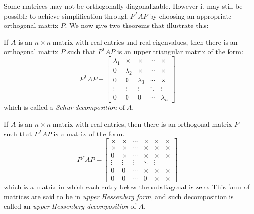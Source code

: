 \documentclass{report}
\begin{document}
			Some matrices may not be orthogonally diagonalizable. However it may still be possible to achieve simplification through $P^TAP$ by choosing an appropriate orthogonal matrix $P$. We now give two theorems that illustrate this:
			
			\begin{thm}
				If $A$ is an $n \times n$ matrix with real entries and real eigenvalues, then there is an orthogonal matrix $P$ such that $P^TAP$ is an upper triangular matrix of the form:
				\begin{displaymath}
					P^TAP=\begin{bmatrix}
					\lambda_1 & \times & \times & \cdots & \times \\
					0 & \lambda_2 & \times & \cdots & \times \\
					0 & 0 & \lambda_3 & \cdots & \times \\
					\vdots & \vdots & \vdots & \ddots & \vdots \\
					0 & 0 & 0 & \cdots & \lambda_n
					\end{bmatrix}
				\end{displaymath}
				which is called a \emph{Schur decomposition} of $A$.
			\end{thm}
			
			\begin{thm}
				If $A$ is an $n \times n$ matrix with real entries, then there is an orthogonal matrix $P$ such that $P^TAP$ is a matrix of the form:
				\begin{displaymath}
				P^TAP=\begin{bmatrix}
				\times & \times & \cdots & \times & \times & \times \\
				\times & \times & \cdots & \times & \times & \times \\
				0 & \times & \cdots & \times & \times & \times \\
				\vdots & \vdots & \vdots & \ddots & \vdots \\
				0 & 0 & \cdots & \times & \times & \times \\
				0 & 0 & \cdots & 0 & \times & \times
				\end{bmatrix}
				\end{displaymath}
				which is a matrix in which each entry below the subdiagonal is zero. This form of matrices are said to be in \emph{upper Hessenberg form}, and such decomposition is called an \emph{upper Hessenberg decomposition} of $A$.
			\end{thm}
\end{document}
